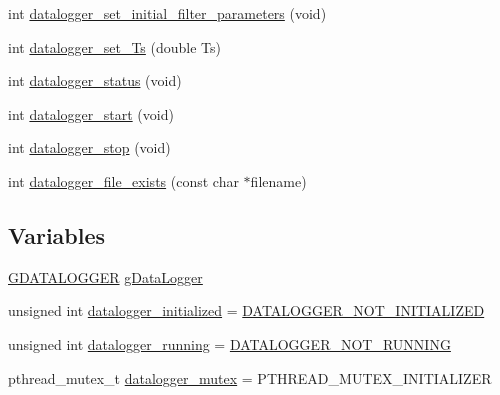 \begin{DoxyCompactItemize}
\item 
int \hyperlink{datalogger_01_07Caio-PC's_01conflicted_01copy_012012-11-23_08_8c_ab6ac2af04feced08fc55c4190103f789}{datalogger\-\_\-set\-\_\-initial\-\_\-filter\-\_\-parameters} (void)
\item 
int \hyperlink{datalogger_01_07Caio-PC's_01conflicted_01copy_012012-11-23_08_8c_afb69d166f8d53042825174cee225ea49}{datalogger\-\_\-set\-\_\-\-Ts} (double Ts)
\item 
int \hyperlink{datalogger_01_07Caio-PC's_01conflicted_01copy_012012-11-23_08_8c_a46fd1290d9ee97d5fc7171e1e0dcb0aa}{datalogger\-\_\-status} (void)
\item 
int \hyperlink{datalogger_01_07Caio-PC's_01conflicted_01copy_012012-11-23_08_8c_a1f254ef380d595d6605c10811fd0dee6}{datalogger\-\_\-start} (void)
\item 
int \hyperlink{datalogger_01_07Caio-PC's_01conflicted_01copy_012012-11-23_08_8c_aae2ffbc6cbf8f1cfecceb42c5139530a}{datalogger\-\_\-stop} (void)
\item 
int \hyperlink{datalogger_01_07Caio-PC's_01conflicted_01copy_012012-11-23_08_8c_a29bc3190cba1f225ad3b2eed899a6762}{datalogger\-\_\-file\-\_\-exists} (const char $\ast$filename)
\end{DoxyCompactItemize}
\subsection*{Variables}
\begin{DoxyCompactItemize}
\item 
\hyperlink{structGDATALOGGER}{G\-D\-A\-T\-A\-L\-O\-G\-G\-E\-R} \hyperlink{datalogger_01_07Caio-PC's_01conflicted_01copy_012012-11-23_08_8c_abe3b9c2c4e21e79c7b046b5986d13acc}{g\-Data\-Logger}
\item 
unsigned int \hyperlink{datalogger_01_07Caio-PC's_01conflicted_01copy_012012-11-23_08_8c_a35e8fbe04b90452afdc3c1be16ff6187}{datalogger\-\_\-initialized} = \hyperlink{datalogger_8h_a4602a65fdfa920dfe832cfa50b7ee4c8}{D\-A\-T\-A\-L\-O\-G\-G\-E\-R\-\_\-\-N\-O\-T\-\_\-\-I\-N\-I\-T\-I\-A\-L\-I\-Z\-E\-D}
\item 
unsigned int \hyperlink{datalogger_01_07Caio-PC's_01conflicted_01copy_012012-11-23_08_8c_a185c3ede96449d14f330fe5ac664e799}{datalogger\-\_\-running} = \hyperlink{datalogger_8h_a1a224da36800f52f56f30619849f7f5d}{D\-A\-T\-A\-L\-O\-G\-G\-E\-R\-\_\-\-N\-O\-T\-\_\-\-R\-U\-N\-N\-I\-N\-G}
\item 
pthread\-\_\-mutex\-\_\-t \hyperlink{datalogger_01_07Caio-PC's_01conflicted_01copy_012012-11-23_08_8c_a824d6f7fd1d3898ba0b1100ba37875c6}{datalogger\-\_\-mutex} = P\-T\-H\-R\-E\-A\-D\-\_\-\-M\-U\-T\-E\-X\-\_\-\-I\-N\-I\-T\-I\-A\-L\-I\-Z\-E\-R
\end{DoxyCompactItemize}


